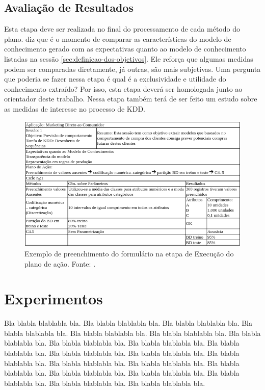 \documentclass[diss,capa]{texufpel}
\begin{document}
\section{Avaliação de Resultados}
\label{sec:avaliacao-de-resultados}

Esta etapa deve ser realizada no final do processamento de cada método do plano. \citet{goldschmidt2015data} diz que é o momento de comparar as características do modelo de conhecimento gerado com as expectativas quanto ao modelo de conhecimento listadas na sessão \ref{sec:definicao-dos-objetivos}. Ele reforça que algumas medidas podem ser comparadas diretamente, já outras, são mais subjetivas. Uma pergunta que poderia se fazer nessa etapa é qual é a exclusividade e utilidade do conhecimento extraído? Por isso, esta etapa deverá ser homologada junto ao orientador deste trabalho. Nessa etapa também terá de ser feito um estudo sobre as medidas de interesse no processo de KDD.

\begin{figure}[htbp]
  \centering \includegraphics[scale=.4]{imagens/formulario-etapa-execucao-dos-planos-de-acao.png}
  \caption{Exemplo de preenchimento do formulário na etapa de Execução do plano de ação. Fonte: \cite{goldschmidt2015data}.}
  \label{fig:formulario-etapa-execucao-dos-planos-de-acao}
\end{figure}

\chapter{Experimentos}

  Bla blabla blablabla bla.  Bla blabla blablabla bla.  Bla blabla
  blablabla bla.  Bla blabla blablabla bla.  Bla blabla blablabla bla.
  Bla blabla blablabla bla.  Bla blabla blablabla bla.  Bla blabla
  blablabla bla.  Bla blabla blablabla bla.  Bla blabla blablabla bla.
  Bla blabla blablabla bla.  Bla blabla blablabla bla.  Bla blabla
  blablabla bla.  Bla blabla blablabla bla.  Bla blabla blablabla bla.
  Bla blabla blablabla bla.  Bla blabla blablabla bla.  Bla blabla
  blablabla bla.  Bla blabla blablabla bla.  Bla blabla blablabla bla.
  Bla blabla blablabla bla.
\end{document}

